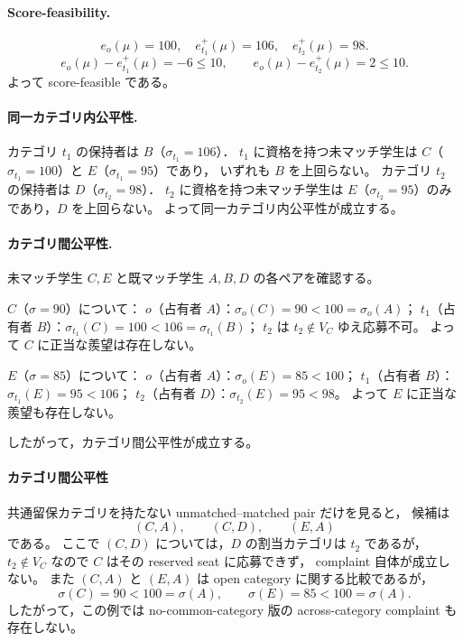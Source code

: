 \documentclass[
  12pt,
  a4paper,
  oneside,
  onecolumn,
  titlepage,
  final
]{jsarticle}
\newcommand{\1}{\mathbf{1}}
\begin{document}
\paragraph{Score-feasibility.}
\[
    e_o(\mu)=100,\quad
    e_{t_1}^+(\mu)=106,\quad
    e_{t_2}^+(\mu)=98.
\]
\[
    e_o(\mu)-e_{t_1}^+(\mu)=-6\leq 10,\qquad
    e_o(\mu)-e_{t_2}^+(\mu)=2\leq 10.
\]
よって score-feasible である。
 
\paragraph{同一カテゴリ内公平性.}
カテゴリ $t_1$ の保持者は $B$（$\sigma_{t_1}=106$）．
$t_1$ に資格を持つ未マッチ学生は $C$（$\sigma_{t_1}=100$）と $E$（$\sigma_{t_1}=95$）であり，
いずれも $B$ を上回らない。
カテゴリ $t_2$ の保持者は $D$（$\sigma_{t_2}=98$）．
$t_2$ に資格を持つ未マッチ学生は $E$（$\sigma_{t_2}=95$）のみであり，$D$ を上回らない。
よって同一カテゴリ内公平性が成立する。
 
\paragraph{カテゴリ間公平性.}
未マッチ学生 $C,E$ と既マッチ学生 $A,B,D$ の各ペアを確認する。
 
$C$（$\sigma=90$）について：
$o$（占有者 $A$）：$\sigma_o(C)=90<100=\sigma_o(A)$；
$t_1$（占有者 $B$）：$\sigma_{t_1}(C)=100<106=\sigma_{t_1}(B)$；
$t_2$ は $t_2\notin V_C$ ゆえ応募不可。
よって $C$ に正当な羨望は存在しない。
 
$E$（$\sigma=85$）について：
$o$（占有者 $A$）：$\sigma_o(E)=85<100$；
$t_1$（占有者 $B$）：$\sigma_{t_1}(E)=95<106$；
$t_2$（占有者 $D$）：$\sigma_{t_2}(E)=95<98$。
よって $E$ に正当な羨望も存在しない。
 
したがって，カテゴリ間公平性が成立する。

\paragraph{カテゴリ間公平性}
共通留保カテゴリを持たない unmatched--matched pair だけを見ると，
候補は
\[
    (C,A),\qquad (C,D),\qquad (E,A)
\]
である。
ここで $(C,D)$ については，$D$ の割当カテゴリは $t_2$ であるが，
$t_2\notin V_C$ なので $C$ はその reserved seat に応募できず，
complaint 自体が成立しない。
また $(C,A)$ と $(E,A)$ は open category に関する比較であるが，
\[
    \sigma(C)=90<100=\sigma(A),\qquad
    \sigma(E)=85<100=\sigma(A).
\]
したがって，この例では no-common-category 版の across-category complaint も存在しない。
\end{document}

